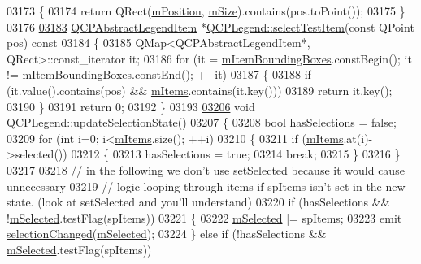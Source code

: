 \begin{DoxyCode}
03173 \textcolor{keyword}{}\{
03174   \textcolor{keywordflow}{return} QRect(\hyperlink{a00045_a1a1033e581aba17a234a320b7fffc739}{mPosition}, \hyperlink{a00045_aa55b33bf64e26c76e6475fd3140af8a2}{mSize}).contains(pos.toPoint());
03175 \}
03176 
\hypertarget{a00115_source_l03183}{}\hyperlink{a00045_a8bbb0b003cc93f07dff1d69416b606f0}{03183} \hyperlink{a00023}{QCPAbstractLegendItem} *\hyperlink{a00045_a8bbb0b003cc93f07dff1d69416b606f0}{QCPLegend::selectTestItem}(\textcolor{keyword}{const} QPoint
       pos)\textcolor{keyword}{ const}
03184 \textcolor{keyword}{}\{
03185   QMap<QCPAbstractLegendItem*, QRect>::const\_iterator it;
03186   \textcolor{keywordflow}{for} (it = \hyperlink{a00045_ae3cf93cee4fa6e7b1966e3c5597004c3}{mItemBoundingBoxes}.constBegin(); it != 
      \hyperlink{a00045_ae3cf93cee4fa6e7b1966e3c5597004c3}{mItemBoundingBoxes}.constEnd(); ++it)
03187   \{
03188     \textcolor{keywordflow}{if} (it.value().contains(pos) && \hyperlink{a00045_a9ae61eaf9434d9f315696bf03c8e4455}{mItems}.contains(it.key()))
03189       \textcolor{keywordflow}{return} it.key();
03190   \}
03191   \textcolor{keywordflow}{return} 0;
03192 \}
03193 
\hypertarget{a00115_source_l03206}{}\hyperlink{a00045_ac214f7503cf46225f08f91003f554bdd}{03206} \textcolor{keywordtype}{void} \hyperlink{a00045_ac214f7503cf46225f08f91003f554bdd}{QCPLegend::updateSelectionState}()
03207 \{
03208   \textcolor{keywordtype}{bool} hasSelections = \textcolor{keyword}{false};
03209   \textcolor{keywordflow}{for} (\textcolor{keywordtype}{int} i=0; i<\hyperlink{a00045_a9ae61eaf9434d9f315696bf03c8e4455}{mItems}.size(); ++i)
03210   \{
03211     \textcolor{keywordflow}{if} (\hyperlink{a00045_a9ae61eaf9434d9f315696bf03c8e4455}{mItems}.at(i)->selected())
03212     \{
03213       hasSelections = \textcolor{keyword}{true};
03214       \textcolor{keywordflow}{break};
03215     \}
03216   \}
03217   
03218   \textcolor{comment}{// in the following we don't use setSelected because it would cause unnecessary}
03219   \textcolor{comment}{// logic looping through items if spItems isn't set in the new state. (look at setSelected and you'll
       understand)}
03220   \textcolor{keywordflow}{if} (hasSelections && !\hyperlink{a00045_a735cbf24a0cd72b712bb01dfa7d909b2}{mSelected}.testFlag(spItems))
03221   \{
03222     \hyperlink{a00045_a735cbf24a0cd72b712bb01dfa7d909b2}{mSelected} |= spItems;
03223     emit \hyperlink{a00045_a286149b644d5f5c884a0140219d979f6}{selectionChanged}(\hyperlink{a00045_a735cbf24a0cd72b712bb01dfa7d909b2}{mSelected});
03224   \} \textcolor{keywordflow}{else} \textcolor{keywordflow}{if} (!hasSelections && \hyperlink{a00045_a735cbf24a0cd72b712bb01dfa7d909b2}{mSelected}.testFlag(spItems))

\end{DoxyCode}
